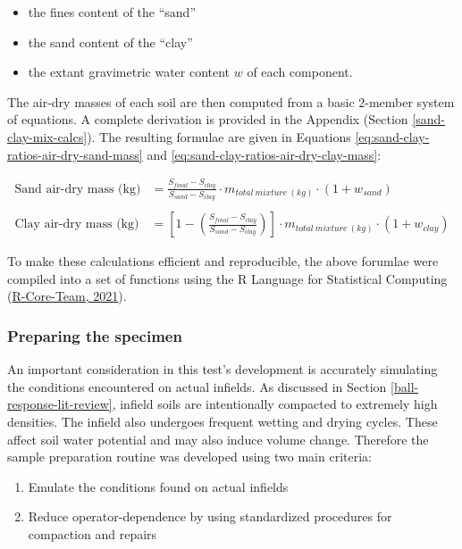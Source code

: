 \documentclass[
  letterpaper,
  openany]{book}
\begin{document}
\begin{itemize}
\item
  the fines content of the ``sand''
\item
  the sand content of the ``clay''
\item
  the extant gravimetric water content \(w\) of each component.
\end{itemize}

The air-dry masses of each soil are then computed from a basic 2-member system of equations.
A complete derivation is provided in the Appendix (Section \ref{sand-clay-mix-calcs}).
The resulting formulae are given in Equations \eqref{eq:sand-clay-ratios-air-dry-sand-mass} and \eqref{eq:sand-clay-ratios-air-dry-clay-mass}:

\begin{align}
  \text{Sand air-dry mass (kg)} &= \frac{S_{final}-S_{clay}}{S_{sand} - S_{clay}}  \cdot m_{total~mixture~(kg)} \cdot (1+w_{sand })
\label{eq:sand-clay-ratios-air-dry-sand-mass} \\
\nonumber \\
\text{Clay air-dry mass (kg)} &= \left[1 - \left( \frac{S_{final} - S_{clay}}{S_{sand} - S_{clay}} \right) \right] \cdot m_{total~mixture~(kg)} \cdot (1+w_{clay})
\label{eq:sand-clay-ratios-air-dry-clay-mass}
\end{align}

To make these calculations efficient and reproducible, the above forumlae were compiled into a set of functions using the R Language for Statistical Computing (\protect\hyperlink{ref-R-core2021}{R-Core-Team, 2021}).

\hypertarget{preparing-the-specimen}{%
\subsubsection{Preparing the specimen}\label{preparing-the-specimen}}

An important consideration in this test's development is accurately simulating the conditions encountered on actual infields. As discussed in Section \ref{ball-response-lit-review}, infield soils are intentionally compacted to extremely high densities.
The infield also undergoes frequent wetting and drying cycles. These affect soil water potential and may also induce volume change. Therefore the sample preparation routine was developed using two main criteria:

\begin{enumerate}
\def\labelenumi{\arabic{enumi}.}
\item
  Emulate the conditions found on actual infields
\item
  Reduce operator-dependence by using standardized procedures for compaction and repairs
\end{enumerate}
\end{document}
